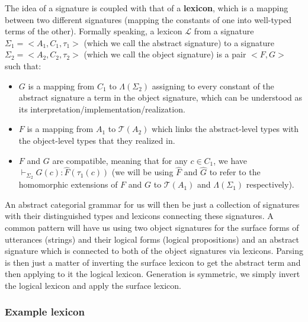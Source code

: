 The idea of a signature is coupled with that of a \textbf{lexicon},
which is a mapping between two different signatures (mapping the
constants of one into well-typed terms of the other). Formally speaking,
a lexicon $\mathcal{L}$ from a signature $\Sigma_1 = \mathopen{<}A_1, C_1,
\tau_1\mathclose{>}$ (which we call the abstract signature) to a
signature $\Sigma_2 = \mathopen{<}A_2, C_2, \tau_2\mathclose{>}$ (which
we call the object signature) is a pair $\mathopen{<}F, G\mathclose{>}$
such that:
\begin{itemize}
\item $G$ is a mapping from $C_1$ to $\Lambda(\Sigma_2)$ assigning to
  every constant of the abstract signature a term in the object
  signature, which can be understood as its
  interpretation/implementation/realization.
\item $F$ is a mapping from $A_1$ to $\mathcal{T}(A_2)$ which links the
  abstract-level types with the object-level types that they realized
  in.
\item $F$ and $G$ are compatible, meaning that for any $c \in C_1$, we
  have $\vdash_{\Sigma_2} G(c) : \hat{F}(\tau_1(c))$ (we will be using
  $\hat{F}$ and $\hat{G}$ to refer to the homomorphic extensions of $F$
  and $G$ to $\mathcal{T}(A_1)$ and $\Lambda(\Sigma_1)$ respectively).
\end{itemize}

An abstract categorial grammar for us will then be just a collection of
signatures with their distinguished types and lexicons connecting these
signatures. A common pattern will have us using two object signatures
for the surface forms of utterances (strings) and their logical forms
(logical propositions) and an abstract signature which is connected to
both of the object signatures via lexicons. Parsing is then just a
matter of inverting the surface lexicon to get the abstract term and
then applying to it the logical lexicon. Generation is symmetric, we
simply invert the logical lexicon and apply the surface lexicon.

\subsubsection{Example lexicon}
\label{sssec:example-lex}

\newcommand{\synt}[1]{C_{\textrm{#1}}}


